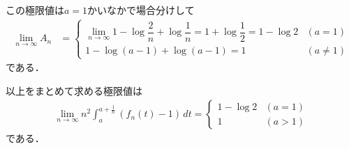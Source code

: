 \documentclass[../../main.tex]{subfiles}
\begin{document}
この極限値は$a=1$かいなかで場合分けして
\begin{align}
  \lim_{n\to\infty} A_n &=
  \begin{cases}
    \lim_{n\to\infty} 1-\log\dfrac{2}{n}+\log\dfrac{1}{n}=1+\log\dfrac{1}{2}=1-\log2 & (a=1) \\
    1 - \log(a-1) + \log(a-1) = 1 & (a \neq 1)
  \end{cases}
\end{align}
である．

以上をまとめて求める極限値は
\begin{align}
  \lim_{n\to\infty}n^2\int_a^{a+\frac{1}{n}}(f_n(t)-1)\,dt=
  \begin{cases}\displaystyle
    1-\log2 & (a=1)\\
    1 & (a>1)
  \end{cases}
\end{align}
である．

\newpage
\end{document}
